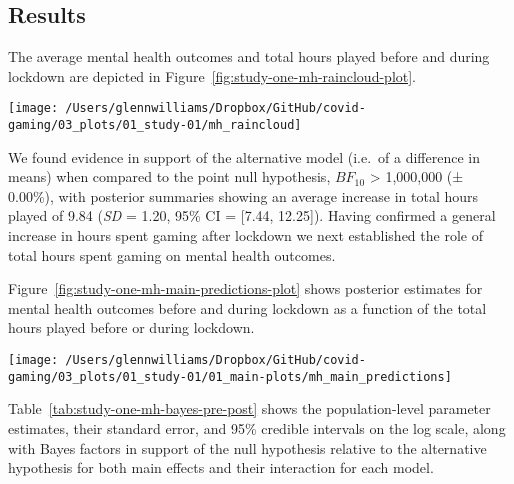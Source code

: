 \documentclass[
  english,
  man,floatsintext]{apa6}
\begin{document}
\hypertarget{results}{%
\subsection{Results}\label{results}}

The average mental health outcomes and total hours played before and during lockdown are depicted in Figure~\ref{fig:study-one-mh-raincloud-plot}.

\begin{figure*}[!htbp]

{\centering \texttt{[image: /Users/glennwilliams/Dropbox/GitHub/covid-gaming/03\_plots/01\_study-01/mh\_raincloud]} 

}

\caption{Mental health outcomes for the depression, anxiety, stress, and loneliness along with total hours played before and during lockdown. Dots represent individual participants' mean (jittered) scores.}\label{fig:study-one-mh-raincloud-plot}
\end{figure*}

We found evidence in support of the alternative model (i.e.~of a difference in means) when compared to the point null hypothesis, \(BF_{10}\) \textgreater{} 1,000,000 (± 0.00\%), with posterior summaries showing an average increase in total hours played of 9.84 (\emph{SD} = 1.20, 95\% CI = {[}7.44, 12.25{]}). Having confirmed a general increase in hours spent gaming after lockdown we next established the role of total hours spent gaming on mental health outcomes.

Figure~\ref{fig:study-one-mh-main-predictions-plot} shows posterior estimates for mental health outcomes before and during lockdown as a function of the total hours played before or during lockdown.

\begin{figure*}[!htbp]

{\centering \texttt{[image: /Users/glennwilliams/Dropbox/GitHub/covid-gaming/03\_plots/01\_study-01/01\_main-plots/mh\_main\_predictions]} 

}

\caption{Mental health outcomes for the depression, anxiety, stress, and loneliness measures as a function of total hours played before and during lockdown. Lines and ribbons indicate the posterior median ± 95\% credible intervals.}\label{fig:study-one-mh-main-predictions-plot}
\end{figure*}

Table~\ref{tab:study-one-mh-bayes-pre-post} shows the population-level parameter estimates, their standard error, and 95\% credible intervals on the log scale, along with Bayes factors in support of the null hypothesis relative to the alternative hypothesis for both main effects and their interaction for each model.
\end{document}
